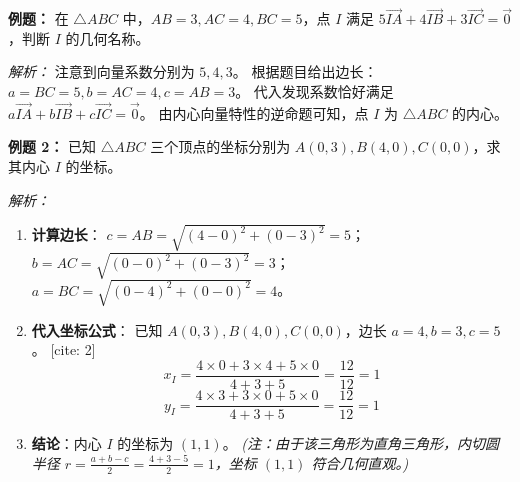\begin{examplebox}
\textbf{例题：} 在 $\triangle ABC$ 中，$AB=3, AC=4, BC=5$，点 $I$ 满足 $5\vec{IA} + 4\vec{IB} + 3\vec{IC} = \vec{0}$，判断 $I$ 的几何名称。

\textit{解析：} 
注意到向量系数分别为 $5, 4, 3$。
根据题目给出边长：$a=BC=5, b=AC=4, c=AB=3$。
代入发现系数恰好满足 $a\vec{IA} + b\vec{IB} + c\vec{IC} = \vec{0}$。
由内心向量特性的逆命题可知，点 $I$ 为 $\triangle ABC$ 的内心。
\end{examplebox}

\begin{examplebox}
\textbf{例题 2：} 已知 $\triangle ABC$ 三个顶点的坐标分别为 $A(0, 3), B(4, 0), C(0, 0)$，求其内心 $I$ 的坐标。

\textit{解析：}
\begin{enumerate}
    \item \textbf{计算边长}：
    $c = AB = \sqrt{(4-0)^2 + (0-3)^2} = 5$；
    $b = AC = \sqrt{(0-0)^2 + (0-3)^2} = 3$；
    $a = BC = \sqrt{(0-4)^2 + (0-0)^2} = 4$。
    \item \textbf{代入坐标公式}：
    已知 $A(0, 3), B(4, 0), C(0, 0)$，边长 $a=4, b=3, c=5$。 [cite: 2]
    \[ x_I = \frac{4 \times 0 + 3 \times 4 + 5 \times 0}{4+3+5} = \frac{12}{12} = 1 \]
    \[ y_I = \frac{4 \times 3 + 3 \times 0 + 5 \times 0}{4+3+5} = \frac{12}{12} = 1 \]
    \item \textbf{结论}：内心 $I$ 的坐标为 $(1, 1)$。
    \textit{(注：由于该三角形为直角三角形，内切圆半径 $r = \frac{a+b-c}{2} = \frac{4+3-5}{2} = 1$，坐标 $(1,1)$ 符合几何直观。)}
\end{enumerate}
\end{examplebox}